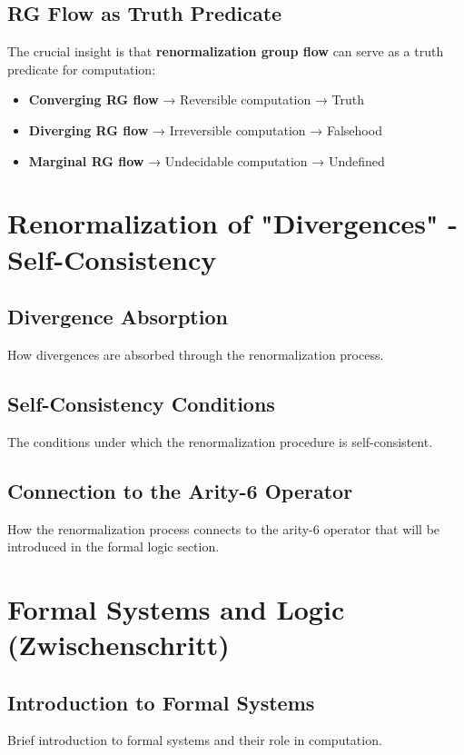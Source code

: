 \documentclass[11pt,a4paper]{article}
\theoremstyle{definition}
\begin{document}
\subsection{RG Flow as Truth Predicate}
The crucial insight is that \textbf{renormalization group flow} can serve as a truth predicate for computation:
\begin{itemize}
\item \textbf{Converging RG flow} → Reversible computation → Truth
\item \textbf{Diverging RG flow} → Irreversible computation → Falsehood  
\item \textbf{Marginal RG flow} → Undecidable computation → Undefined
\end{itemize}

\section{Renormalization of "Divergences" - Self-Consistency}
\label{sec:renormalization}

\subsection{Divergence Absorption}
How divergences are absorbed through the renormalization process.

\subsection{Self-Consistency Conditions}
The conditions under which the renormalization procedure is self-consistent.

\subsection{Connection to the Arity-6 Operator}
How the renormalization process connects to the arity-6 operator that will be introduced in the formal logic section.

\section{Formal Systems and Logic (Zwischenschritt)}
\label{sec:formal-systems}

\subsection{Introduction to Formal Systems}
Brief introduction to formal systems and their role in computation.
\end{document}
